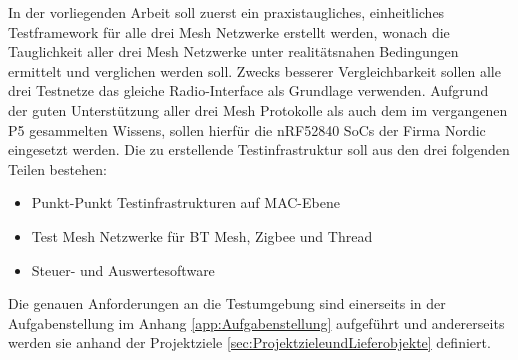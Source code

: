 In der vorliegenden Arbeit soll zuerst ein praxistaugliches, einheitliches Testframework für alle drei Mesh Netzwerke erstellt werden, wonach die Tauglichkeit aller drei Mesh Netzwerke unter realitätsnahen Bedingungen ermittelt und verglichen werden soll.
Zwecks besserer Vergleichbarkeit sollen alle drei Testnetze das gleiche Radio-Interface als Grundlage verwenden. Aufgrund der guten
Unterstützung aller drei Mesh Protokolle als auch dem im vergangenen P5 gesammelten Wissens, sollen hierfür die nRF52840 SoCs der Firma Nordic eingesetzt werden. Die zu erstellende Testinfrastruktur soll aus den drei folgenden Teilen bestehen:

\begin{itemize}
 	\item Punkt-Punkt Testinfrastrukturen auf MAC-Ebene
 	\item Test Mesh Netzwerke für BT Mesh, Zigbee und Thread
 	\item Steuer- und Auswertesoftware
\end{itemize}

Die genauen Anforderungen an die Testumgebung sind einerseits in der Aufgabenstellung im Anhang \ref{app:Aufgabenstellung} aufgeführt und andererseits werden sie anhand der Projektziele \ref{sec:ProjektzieleundLieferobjekte} definiert.








